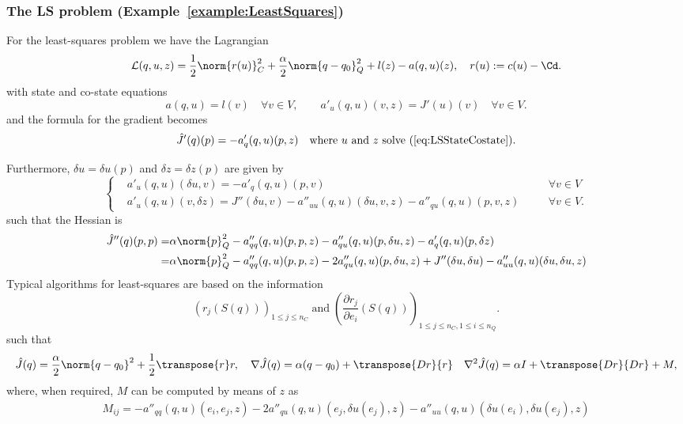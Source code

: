 \subsubsection{The LS problem (Example~\ref{example:LeastSquares})}
%
For the least-squares problem we have the Lagrangian
%
\begin{equation}\label{eq:LSLagrangian}
\mathcal L(q,u,z) = \frac12\norm{r(u)}^2_C + \frac{\alpha}{2}\norm{q-q_0}^2_Q + l(z) - a(q,u)(z),\quad
r(u) := c(u) - \Cd.
\end{equation}
%
%
with state and co-state equations
\begin{equation}\label{eq:LSStateCostate}
a(q,u) = l(v)\quad\forall v\in V,\qquad
a'_u(q,u)(v,z) =J'(u)(v)\quad\forall v\in V.
\end{equation}
and the formula for the gradient becomes
%
\begin{equation}\label{eq:LSGrad}
\hat J'(q)(p) = -a'_q(q,u)(p,z)\quad \mbox{where $u$ and $z$ solve (\ref{eq:LSStateCostate}).}
\end{equation}

Furthermore, $\delta u=\delta u(p)$ and $\delta z=\delta z(p)$ are given by
%
\begin{equation}\label{eq:LSSecondStateCostate}
\left\{
%
\begin{aligned}
&a'_u(q,u)(\delta u, v)= -a'_q(q,u)(p, v)&\quad&\forall v\in V\\
&a'_u(q,u)(v,\delta z) =J''(\delta u,v)-a''_{uu}(q,u)(\delta u, v,z)-a''_{qu}(q,u)(p,v,z)&\quad&\forall v\in V.
\end{aligned}
%
\right.
\end{equation}
%
such that the Hessian is 
%
\begin{equation}\label{eq:LSHessian}
%
\begin{aligned}
\hat J''(q)(p,p) =& \alpha\norm{p}^2_Q -a''_{qq}(q,u)(p,p,z)-a''_{qu}(q,u)(p,\delta u,z)-a'_q(q,u)(p, \delta z)\\
=& \alpha\norm{p}^2_Q -a''_{qq}(q,u)(p,p,z)-2a''_{qu}(q,u)(p,\delta u,z) 
+ J''(\delta u,\delta u)-a''_{uu}(q,u)(\delta u, \delta u,z)
\end{aligned}
%
\end{equation}
%
Typical algorithms for least-squares are based on the information 
\[
(r_j(S(q)))_{1\le j\le n_C}\;\mbox{and}\;(\frac{\partial r_j}{\partial e_i}(S(q)))_{1\le j\le n_C, 1\le i\le n_Q}.
\]
such that
\[
\hat J(q) = \frac{\alpha}{2}\norm{q-q_0}^2 + \frac12 \transpose{r}r,\quad
\nabla \hat J(q) = \alpha(q-q_0) + \transpose{Dr}{r}\quad
\nabla^2 \hat J(q) = \alpha I + \transpose{Dr}{Dr} + M,
\]
where, when required, $M$ can be computed by means of $z$ as
%
\begin{align*}
M_{ij} = -a''_{qq}(q,u)(e_i,e_j,z)-2a''_{qu}(q,u)(e_j,\delta u(e_j),z) 
-a''_{uu}(q,u)(\delta u(e_i), \delta u(e_j),z)
\end{align*}
%



